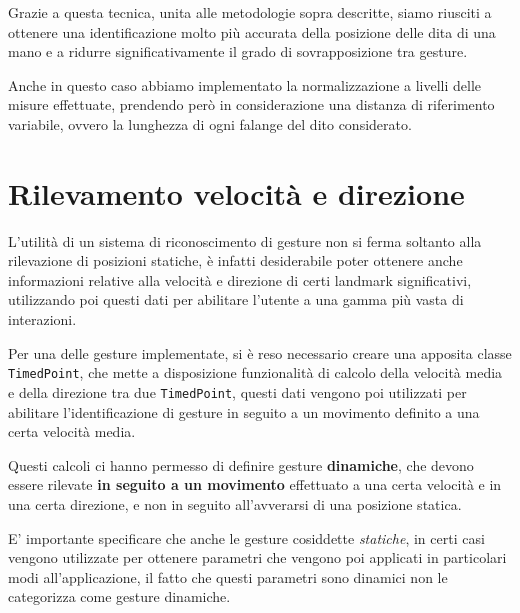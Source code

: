 Grazie a questa tecnica, unita alle metodologie sopra descritte, siamo riusciti a ottenere una identificazione molto più accurata della posizione delle dita di una mano e a ridurre significativamente il grado di sovrapposizione tra gesture.

Anche in questo caso abbiamo implementato la normalizzazione a livelli delle misure effettuate, prendendo però in considerazione una distanza di riferimento variabile, ovvero la lunghezza di ogni falange del dito considerato.

\section{Rilevamento velocità e direzione}

L'utilità di un sistema di riconoscimento di gesture non si ferma soltanto alla rilevazione di posizioni statiche, è infatti desiderabile poter ottenere anche informazioni relative alla velocità e direzione di certi landmark significativi, utilizzando poi questi dati per abilitare l'utente a una gamma più vasta di interazioni.

Per una delle gesture implementate, si è reso necessario creare una apposita classe \texttt{TimedPoint}, che mette a disposizione funzionalità di calcolo della velocità media e della direzione tra due \texttt{TimedPoint}, questi dati vengono poi utilizzati per abilitare l'identificazione di gesture in seguito a un movimento definito a una certa velocità media.

Questi calcoli ci hanno permesso di definire gesture \textbf{dinamiche}, che devono essere rilevate \textbf{in seguito a un movimento} effettuato a una certa velocità e in una certa direzione, e non in seguito all'avverarsi di una posizione statica.

E' importante specificare che anche le gesture cosiddette \textit{statiche}, in certi casi vengono utilizzate per ottenere parametri che vengono poi applicati in particolari modi all'applicazione, il fatto che questi parametri sono dinamici non le categorizza come gesture dinamiche. 


